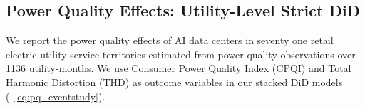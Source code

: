 \documentclass[a4paper,fleqn,longmktitle]{cas-sc}
\begin{document}
\subsection{Power Quality Effects: Utility-Level Strict DiD}



We report the power quality effects of AI data centers in seventy one retail electric utility service territories estimated from power quality observations over 1136 utility-months. We use Consumer Power Quality Index (CPQI) and Total Harmonic Distortion (THD) as outcome variables in our stacked DiD models (~\autoref{eq:pq_eventstudy}). 
\end{document}
